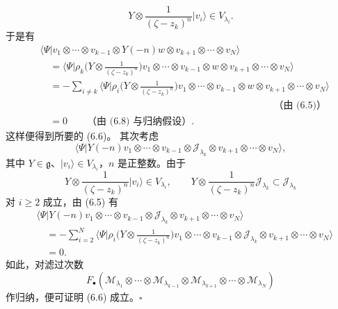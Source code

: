 \begin{equation}
Y\otimes\frac{1}{(\zeta-z_k)^n}|v_i\rangle\in V_{\lambda_i}.\tag{6.8}
\end{equation}
于是有
\begin{align*}
&\langle\Psi|v_1\otimes\cdots\otimes v_{k-1}\otimes Y(-n)w\otimes v_{k+1}\otimes\cdots\otimes v_N\rangle\\
&\quad=\Big\langle\Psi\Big|\rho_k\Big(Y\otimes\frac{1}{(\zeta-z_k)^n}\Big)v_1\otimes\cdots\otimes v_{k-1}\otimes w\otimes v_{k+1}\otimes\cdots\otimes v_N\Big\rangle\\
&\quad=-\sum_{i\ne k}\Big\langle\Psi\Big|\rho_i\Big(Y\otimes\frac{1}{(\zeta-z_k)^n}\Big)v_1\otimes\cdots\otimes v_{k-1}\otimes w\otimes v_{k+1}\otimes\cdots\otimes v_N\Big\rangle\\
&\qquad\qquad\qquad\qquad\qquad\qquad\qquad\qquad\qquad\qquad\qquad\qquad\text{（由 (6.5)）}\\
&\quad=0\qquad\text{（由 (6.8) 与归纳假设）}.
\end{align*}
这样便得到所要的 (6.6)。
其次考虑
\[
\langle\Psi|Y(-n)v_1\otimes\cdots\otimes v_{k-1}\otimes\mathcal{J}_{\lambda_k}\otimes v_{k+1}\otimes\cdots\otimes v_N\rangle,
\]
其中 $Y\in\mathfrak{g}$、$|v_i\rangle\in V_{\lambda_i}$，$n$ 是正整数。由于
\[
Y\otimes\frac{1}{(\zeta-z_k)^n}|v_i\rangle\in V_{\lambda_i},\qquad Y\otimes\frac{1}{(\zeta-z_k)^n}\mathcal{J}_{\lambda_k}\subset\mathcal{J}_{\lambda_k}
\]
对 $i\ge 2$ 成立，由 (6.5) 有
\begin{align}
&\langle\Psi|Y(-n)v_1\otimes\cdots\otimes v_{k-1}\otimes\mathcal{J}_{\lambda_k}\otimes v_{k+1}\otimes\cdots\otimes v_N\rangle\nonumber\\
&\quad=-\sum_{i=2}^{N}\Big\langle\Psi\Big|\rho_i\Big(Y\otimes\frac{1}{(\zeta-z_k)^n}\Big)v_1\otimes\cdots\otimes v_{k-1}\otimes\mathcal{J}_{\lambda_k}\otimes v_{k+1}\otimes\cdots\otimes v_N\Big\rangle\tag{6.9}\\
&\quad=0.\nonumber
\end{align}
如此，对滤过次数
\[
F_\bullet(\mathcal{M}_{\lambda_1}\otimes\cdots\otimes\mathcal{M}_{\lambda_{k-1}}\otimes\mathcal{M}_{\lambda_{k+1}}\otimes\cdots\otimes\mathcal{M}_{\lambda_N})
\]
作归纳，便可证明 (6.6) 成立。\hfill$\square$
